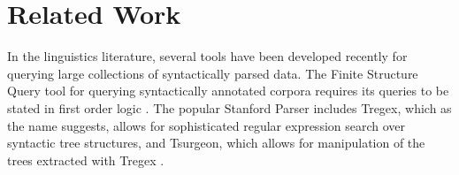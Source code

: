 
\section{Related Work}

In the linguistics literature, several tools have been developed recently for querying large collections of syntactically parsed data.  The Finite Structure Query tool for querying syntactically annotated corpora requires its queries to be stated in first order logic \cite{kepser2003finite}.  The popular Stanford Parser includes Tregex, which as the name suggests,  allows for sophisticated regular expression search over syntactic tree structures, and Tsurgeon, which allows for manipulation of the trees extracted with Tregex \cite{levy2006tregex}.